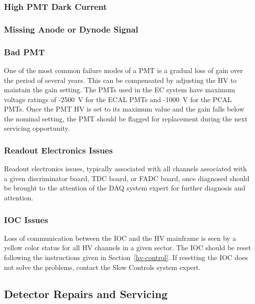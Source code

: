 \documentclass[letterpaper,10pt]{article}
\begin{document}
\subsubsection{High PMT Dark Current}
\label{high-current}

\subsubsection{Missing Anode or Dynode Signal}
\label{missing}


\subsubsection{Bad PMT}
\label{bad-pmt}

One of the most common failure modes of a PMT is a gradual loss of gain over the period of
several years. This can be compensated by adjusting the HV to maintain the gain setting. The
PMTs used in the EC system have maximum voltage ratings of -2500~V for the ECAL PMTs and
-1000~V for the PCAL PMTs.  Once the PMT HV is set to its maximum value
and the gain falls below the nominal setting, the PMT should be flagged for replacement during
the next servicing opportunity.

\subsubsection{Readout Electronics Issues}
\label{readout-issues}

Readout electronics issues, typically associated with all channels associated with a given
discriminator board, TDC board, or FADC board, once diagnosed should be brought to the
attention of the DAQ system expert for further diagnosis and attention.

\subsubsection{IOC Issues}
\label{ioc-issues}

Loss of communication between the IOC and the HV mainframe is seen by a yellow color status for
all HV channels in a given sector. The IOC should be reset following the instructions given in
Section~\ref{hv-control}. If resetting the IOC does not solve the problems, contact the 
Slow Controls system expert.

\subsection{Detector Repairs and Servicing}
\end{document}
